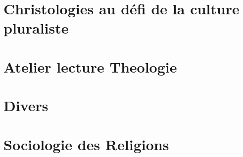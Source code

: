 \documentclass[oneside,10pt]{book} %
\begin{document}
 
 
 
 

 

 
\part{Christologies au défi de la culture pluraliste}




 



 





 
  \part{Atelier lecture Theologie}
 
 
 
  
  
    
  
 

 
 
 
 \part{Divers}



 


 \part{Sociologie des Religions}
 
 
\end{document}
